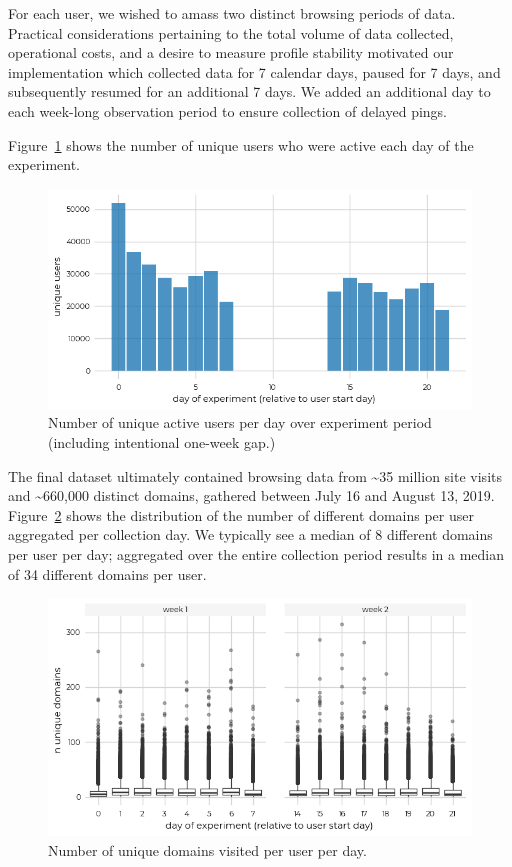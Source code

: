 \documentclass[letterpaper,twocolumn,10pt]{article}
\begin{document}
For each user, we wished to amass two distinct browsing periods of data. 
Practical considerations pertaining to the total volume of data collected, operational costs, and a desire to measure profile stability motivated our implementation which collected data for 7 calendar days, paused for 7 days, and subsequently resumed for an additional 7 days. 
We added an additional day to each week-long observation period to ensure collection of delayed pings. 

Figure~\ref{fig:pioneers_per_day} shows the number of unique users who were active each day of the experiment.
%
\begin{figure}[htbp]
    \centering
    \includegraphics[width=0.9\linewidth]{figures/pioneers_per_day.png}
    \caption{Number of unique active users per day over experiment period (including intentional one-week gap.)}
    \label{fig:pioneers_per_day}
\end{figure}
%
The final dataset ultimately contained browsing data from \textasciitilde{35} million site visits and \textasciitilde{660,000} distinct domains, gathered between July 16 and August 13, 2019.
Figure~\ref{fig:domains_per_day} shows the distribution of the number of different domains per user aggregated per collection day. 
We typically see a median of 8 different domains per user per day; aggregated over the entire collection period results in a median of 34 different domains per user. 

\begin{figure}[ht]
    \centering
    \includegraphics[width=0.9\linewidth]{figures/unique_domains_per_day.png}
    \caption{Number of unique domains visited per user per day.}
    \label{fig:domains_per_day}
\end{figure}
\end{document}
